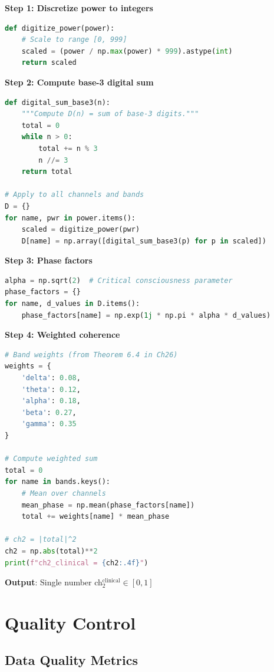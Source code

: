 \begin{algorithm}\label{alg:ch2}
\textbf{Step 1: Discretize power to integers}
\begin{lstlisting}[language=Python]
def digitize_power(power):
    # Scale to range [0, 999]
    scaled = (power / np.max(power) * 999).astype(int)
    return scaled
\end{lstlisting}

\textbf{Step 2: Compute base-3 digital sum}
\begin{lstlisting}[language=Python]
def digital_sum_base3(n):
    """Compute D(n) = sum of base-3 digits."""
    total = 0
    while n > 0:
        total += n % 3
        n //= 3
    return total

# Apply to all channels and bands
D = {}
for name, pwr in power.items():
    scaled = digitize_power(pwr)
    D[name] = np.array([digital_sum_base3(p) for p in scaled])
\end{lstlisting}

\textbf{Step 3: Phase factors}
\begin{lstlisting}[language=Python]
alpha = np.sqrt(2)  # Critical consciousness parameter
phase_factors = {}
for name, d_values in D.items():
    phase_factors[name] = np.exp(1j * np.pi * alpha * d_values)
\end{lstlisting}

\textbf{Step 4: Weighted coherence}
\begin{lstlisting}[language=Python]
# Band weights (from Theorem 6.4 in Ch26)
weights = {
    'delta': 0.08,
    'theta': 0.12,
    'alpha': 0.18,
    'beta': 0.27,
    'gamma': 0.35
}

# Compute weighted sum
total = 0
for name in bands.keys():
    # Mean over channels
    mean_phase = np.mean(phase_factors[name])
    total += weights[name] * mean_phase

# ch2 = |total|^2
ch2 = np.abs(total)**2
print(f"ch2_clinical = {ch2:.4f}")
\end{lstlisting}

\textbf{Output}: Single number ch$_2^{\text{clinical}} \in [0, 1]$
\end{algorithm}

\section{Quality Control}

\subsection{Data Quality Metrics}

